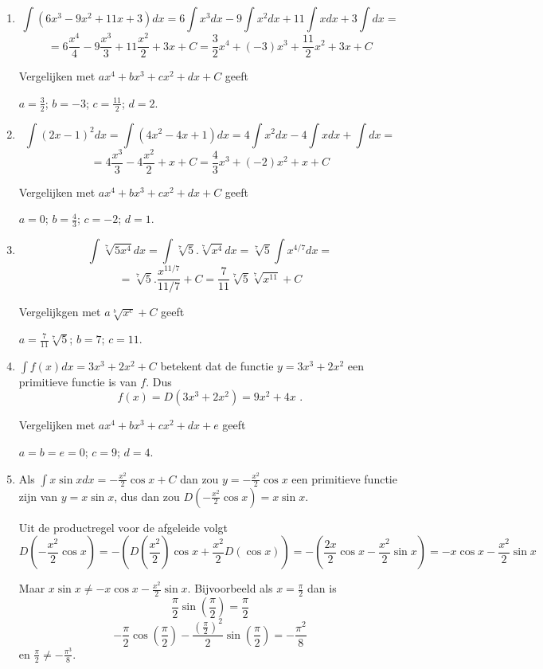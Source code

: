 \documentclass{article}
\begin{document}
\begin{enumerate}

\item

\[
\int \left(  6x^3-9x^2+11x+3  \right)dx = 6 \int x^3dx -9\int x^2dx +11 \int xdx +3 \int dx =
\]
\[
=6 \frac{x^4}{4}-9\frac{x^3}{3}+11\frac{x^2}{2}+3x+C=\frac{3}{2}x^4+(-3)x^3+\frac{11}{2}x^2+3x+C
\]

Vergelijken met $ax^4+bx^3+cx^2+dx+C$ geeft

$a=\frac{3}{2}$; $b=-3$; $c=\frac{11}{2}$; $d=2$.

\item

\[ 
\int (2x-1)^2dx = \int \left(  4x^2-4x+1 \right)dx=4 \int x^2dx - 4 \int xdx +\int dx=
\]
\[
=4 \frac{x^3}{3}-4\frac{x^2}{2}+x+C=\frac{4}{3}x^3+(-2)x^2+x+C
\]

Vergelijken met $ax^4+bx^3+cx^2+dx+C$ geeft

$a=0$; $b=\frac{4}{3}$; $c=-2$; $d=1$.

\item

\[
\int \sqrt[7]{5x^4}dx=\int \sqrt[7]{5}.\sqrt[7]{x^4}dx=\sqrt[7]{5} \int x^{4/7}dx=
\]
\[
=\sqrt[7]{5}.\frac{x^{11/7}}{11/7}+C=\frac{7}{11}\sqrt[7]{5}\sqrt[7]{x^{11}}+C
\]

Vergelijkgen met $a\sqrt[b]{x^c}+C$ geeft

$a=\frac{7}{11}\sqrt[7]{5}$; $b=7$; $c=11$.

\item

$\int f(x)dx=3x^3+2x^2+C$ betekent dat de functie $y=3x^3+2x^2$ een primitieve functie is van $f$.
Dus
\[
f(x)=D \left(  3x^3+2x^2 \right)=9x^2+4x \text { .}
\]

Vergelijken met $ax^4+bx^3+cx^2+dx+e$ geeft

$a=b=e=0$; $c=9$; $d=4$.

\item

Als $\int x \sin x dx=-\frac{x^2}{2} \cos x +C$ dan zou $y=-\frac{x^2}{2}\cos x$ een primitieve functie zijn van $y=x \sin x$, dus dan zou $D\left(  -\frac{x^2}{2}\cos x \right)=x \sin x$.

Uit de productregel voor de afgeleide volgt
\[
D\left(  -\frac{x^2}{2}\cos x \right)=-\left( D \left(  \frac{x^2}{2} \right)\cos x + \frac{x^2}{2} D (\cos x)   \right)=-\left( \frac{2x}{2}\cos x-\frac{x^2}{2} \sin x   \right)=-x\cos x-\frac{x^2}{2} \sin x
\]

Maar $x \sin x \neq -x\cos x-\frac{x^2}{2} \sin x$.
Bijvoorbeeld als $x=\frac{\pi}{2}$ dan is
\[
\frac{\pi}{2}\sin \left(  \frac{\pi}{2} \right)=\frac{\pi}{2}
\]
\[
-\frac{\pi}{2}\cos \left(  \frac{\pi}{2} \right)-\frac{\left( \frac{\pi}{2}  \right)^2}{2}\sin \left( \frac{\pi}{2}  \right)=-\frac{\pi ^2}{8}
\]
en $\frac{\pi}{2} \neq -\frac{\pi ^3}{8}$.


\end{enumerate}
\end{document}
